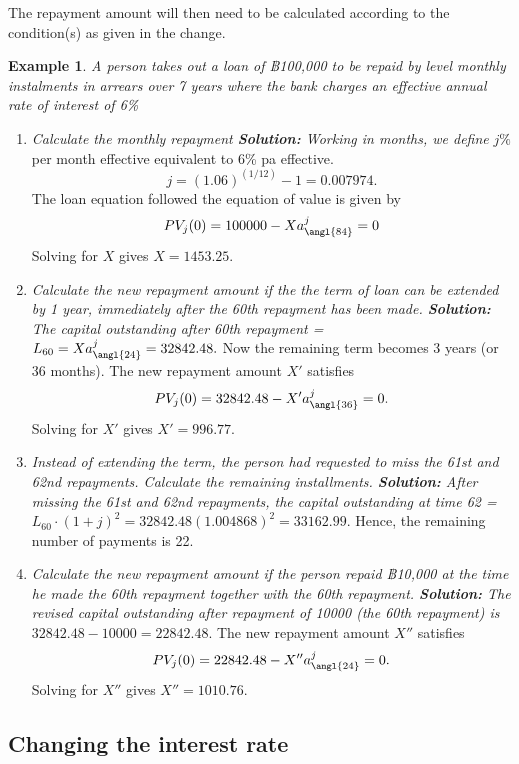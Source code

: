 \documentclass[landscape, 20pt]{extreport}
\theoremstyle{definition}
\theoremstyle{definition}
\newtheorem{example}{Example}[chapter]
\theoremstyle{definition}
\theoremstyle{definition}
\theoremstyle{remark}
\begin{document}
The repayment amount will then need to be calculated according to the
condition(s) as given in the change.

\newpage \begin{example}

\emph{A person takes out a loan of ฿100,000 to be repaid by level monthly
instalments in arrears over 7 years where the bank charges an effective
annual rate of interest of 6\%}

\begin{enumerate}
\def\labelenumi{\arabic{enumi}.}
\item
  \emph{Calculate the monthly repayment \textbf{Solution:} Working in months, we
  define} \(j\%\) per month effective equivalent to 6\% pa effective.
  \[j = (1.06)^{(1/12)} - 1 = 0.007974.\] The loan equation followed
  the equation of value is given by
  \[PV_j(0) = 100000 - X a^j_{\angl{84}} = 0\] Solving for \(X\) gives
  \(X =1453.25\).
\item
  \emph{Calculate the new repayment amount if the the term of loan can be
  extended by 1 year, immediately after the 60th repayment has been
  made. \textbf{Solution:} The capital outstanding after 60th repayment =}
  \(L_{60} = X a^j_{\angl{24}} = 32842.48.\) Now the remaining term
  becomes 3 years (or 36 months). The new repayment amount \(X'\)
  satisfies \[PV_j(0) = 32842.48 - X' a^j_{\angl{36}} = 0.\] Solving
  for \(X'\) gives \(X' = 996.77\).
\item
  \emph{Instead of extending the term, the person had requested to miss the
  61st and 62nd repayments. Calculate the remaining installments.
  \textbf{Solution:} After missing the 61st and 62nd repayments, the
  capital outstanding at time 62 =}
  \(L_{60}\cdot (1+j)^2 = 32842.48 (1.004868)^2 = 33162.99.\) Hence, the
  remaining number of payments is 22.
\item
  \emph{Calculate the new repayment amount if the person repaid ฿10,000 at
  the time he made the 60th repayment together with the 60th
  repayment. \textbf{Solution:} The revised capital outstanding after
  repayment of 10000 (the 60th repayment) is}
  \(32842.48 - 10000 = 22842.48.\) The new repayment amount \(X''\)
  satisfies \[PV_j(0) = 22842.48 - X'' a^j_{\angl{24}} = 0.\] Solving
  for \(X''\) gives \(X'' = 1010.76\).
\end{enumerate}

\end{example}

\newpage \hypertarget{changing-the-interest-rate}{%
\subsection{Changing the interest rate}\label{changing-the-interest-rate}}
\end{document}
